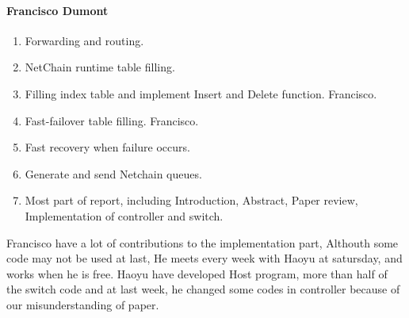 \documentclass[11pt,oneside,a4paper]{article}
\begin{document}
\paragraph{Francisco Dumont}
\begin{enumerate}
    \item Forwarding and routing.
    \item NetChain runtime table filling.
    \item Filling index table and implement Insert and Delete function. Francisco.
    \item Fast-failover table filling. Francisco.
    \item Fast recovery when failure occurs.
    \item Generate and send Netchain queues.
    \item Most part of report, including Introduction, Abstract, Paper review, Implementation of controller and switch.
\end{enumerate}

Francisco have a lot of contributions to the implementation part, Althouth some code may not be used at last, He meets every week with Haoyu at satursday, and works when he is free. Haoyu have developed Host program, more than half of the switch code and at last week, he changed some codes in controller because of our misunderstanding of paper.
\end{document}
